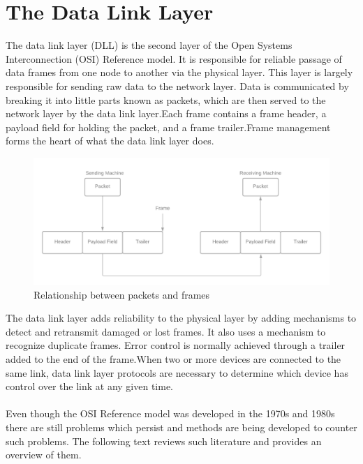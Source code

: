 \documentclass[12pt]{article}
\begin{document}
\section*{The Data Link Layer}
The data link layer (DLL) is the second layer of the Open Systems Interconnection (OSI) Reference model. It is responsible for reliable passage of data frames from one node to another via the  physical  layer.  This  layer  is  largely  responsible  for sending raw data to the network layer. Data is communicated by  breaking  it  into  little  parts  known  as  packets, which  are then served to the network layer by the data link layer.Each frame
contains a frame header, a payload field for holding the packet, and a frame
trailer.Frame management forms the heart of what the
data link layer does.
\begin{figure}[h] %
\centering
\includegraphics[width=\textwidth]{adslkfhkjalsdhf.png}
\caption{Relationship between packets and frames}
\end{figure}
The data link layer adds reliability to the physical layer by adding
mechanisms to detect and retransmit damaged or lost frames. It also uses a mechanism
to recognize duplicate frames. Error control is normally achieved through a
trailer added to the end of the frame.When two or more devices are connected to the same link, data link layer protocols are necessary to determine which device has control over the
link at any given time.
\\ \\
Even though the OSI Reference model was developed in the 1970s and 1980s there are still problems which persist and methods are being developed to counter such problems. The following text reviews such literature and provides an overview of them.
\setcounter{page}{2}
\pagestyle{fancy}
\fancyhf{}
\rhead{\thepage}
\newpage
\end{document}
